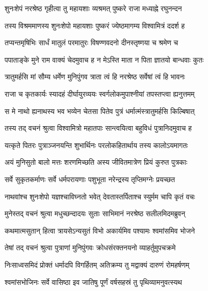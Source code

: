 
\twolineshloka
{शुनःशेपं नरश्रेष्ठ गृहीत्वा तु महायशाः}
{व्यश्रमत् पुष्करे राजा मध्याह्ने रघुनन्दन} %

\twolineshloka
{तस्य विश्रममाणस्य शुनःशेपो महायशाः}
{पुष्करं ज्येष्ठमागम्य विश्वामित्रं ददर्श ह} %

\twolineshloka
{तप्यन्तमृषिभिः सार्धं मातुलं परमातुरः}
{विषण्णवदनो दीनस्तृष्णया च श्रमेण च} %

\twolineshloka
{पपाताङ्के मुने राम वाक्यं चेदमुवाच ह}
{न मेऽस्ति माता न पिता ज्ञातयो बान्धवाः कुतः} %

\twolineshloka
{त्रातुमर्हसि मां सौम्य धर्मेण मुनिपुंगव}
{त्राता त्वं हि नरश्रेष्ठ सर्वेषां त्वं हि भावनः} %

\twolineshloka
{राजा च कृतकार्यः स्यादहं दीर्घायुरव्ययः}
{स्वर्गलोकमुपाश्नीयां तपस्तप्त्वा ह्यनुत्तमम्} %

\twolineshloka
{स मे नाथो ह्यनाथस्य भव भव्येन चेतसा}
{पितेव पुत्रं धर्मात्मंस्त्रातुमर्हसि किल्बिषात्} %

\twolineshloka
{तस्य तद् वचनं श्रुत्वा विश्वामित्रो महातपाः}
{सान्त्वयित्वा बहुविधं पुत्रानिदमुवाच ह} %

\twolineshloka
{यत्कृते पितरः पुत्राञ्जनयन्ति शुभार्थिनः}
{परलोकहितार्थाय तस्य कालोऽयमागतः} %

\twolineshloka
{अयं मुनिसुतो बालो मत्तः शरणमिच्छति}
{अस्य जीवितमात्रेण प्रियं कुरुत पुत्रकाः} %

\twolineshloka
{सर्वे सुकृतकर्माणः सर्वे धर्मपरायणाः}
{पशुभूता नरेन्द्रस्य तृप्तिमग्नेः प्रयच्छत} %

\twolineshloka
{नाथवांश्च शुनःशेपो यज्ञश्चाविघ्नतो भवेत्}
{देवतास्तर्पिताश्च स्युर्मम चापि कृतं वचः} %

\twolineshloka
{मुनेस्तद् वचनं श्रुत्वा मधुच्छन्दादयः सुताः}
{साभिमानं नरश्रेष्ठ सलीलमिदमब्रुवन्} %

\twolineshloka
{कथमात्मसुतान् हित्वा त्रायसेऽन्यसुतं विभो}
{अकार्यमिव पश्यामः श्वमांसमिव भोजने} %

\twolineshloka
{तेषां तद् वचनं श्रुत्वा पुत्राणां मुनिपुंगवः}
{क्रोधसंरक्तनयनो व्याहर्तुमुपचक्रमे} %

\twolineshloka
{निःसाध्वसमिदं प्रोक्तं धर्मादपि विगर्हितम्}
{अतिक्रम्य तु मद्वाक्यं दारुणं रोमहर्षणम्} %

\twolineshloka
{श्वमांसभोजिनः सर्वे वासिष्ठा इव जातिषु}
{पूर्णं वर्षसहस्रं तु पृथिव्यामनुवत्स्यथ} %

